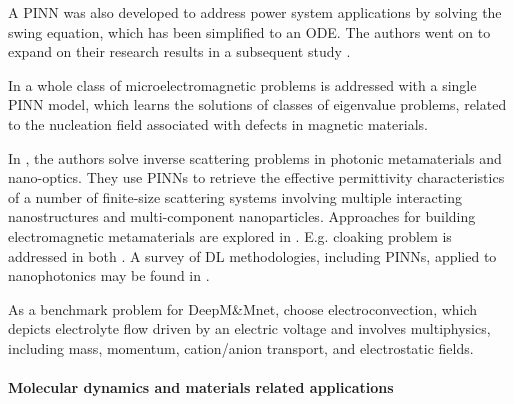 \documentclass[pdflatex,sn-basic]{sn-jnl}%
\theoremstyle{thmstyleone}%
\theoremstyle{thmstyletwo}%
\theoremstyle{thmstylethree}%
\begin{document}
%
A PINN was also developed to address power system applications \citep{Misyris2020PhysicsInformedNN} by solving the swing equation, which has been simplified to an ODE. The authors went on to expand on their research results in a subsequent study \citep{Sti2021_PhysicsInformedNeural_MisSMC}.




In \citep{Kov2022_ConditionalPhysicsInformed_ExlKEK} a whole class of microelectromagnetic problems is addressed with a single PINN model, which learns the solutions of classes of eigenvalue problems, related to the nucleation field associated with defects in magnetic materials.

In \cite{Che2020_PhysicsInformedNeural_LuCLK}, the authors solve inverse scattering problems in photonic metamaterials and nano-optics. They use PINNs to retrieve the effective permittivity characteristics of a number of finite-size scattering systems involving multiple interacting nanostructures and multi-component nanoparticles.  %
Approaches for building electromagnetic metamaterials are explored in \cite{Fan2020_DeepPhysicalInformed_ZhaFZ}. 
E.g. cloaking problem is addressed in both \cite{Fan2020_DeepPhysicalInformed_ZhaFZ, Che2020_PhysicsInformedNeural_LuCLK}.
A survey of DL methodologies, including PINNs, applied to nanophotonics may be found in \cite{Wie2021_DeepLearningNano_ArbWAA}.



As a benchmark problem for DeepM\&Mnet, \cite{Cai2021_DeepmmnetInferringElectroconvection_WanCWL} 
choose electroconvection, which depicts electrolyte flow driven by an electric voltage and involves multiphysics, including mass, momentum, cation/anion transport, and electrostatic fields. %



\paragraph{Molecular dynamics and materials related applications} %
\end{document}
